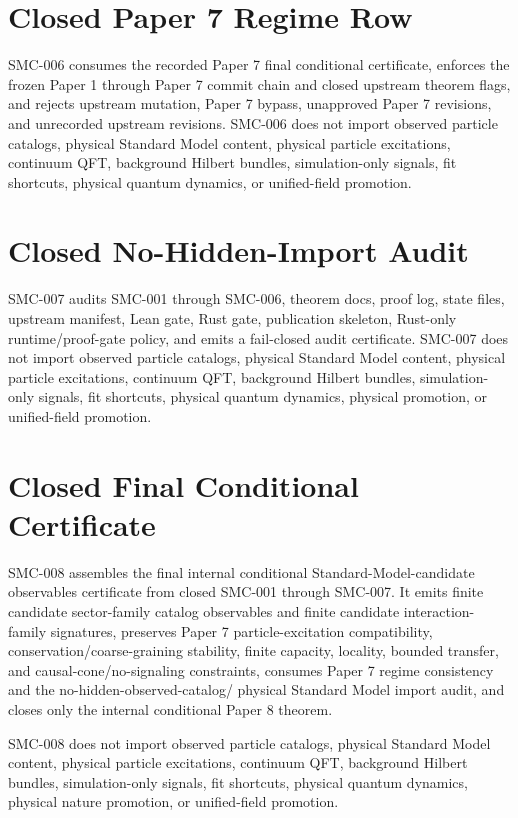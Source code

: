 \documentclass{article}
\begin{document}
\section{Closed Paper 7 Regime Row}

SMC-006 consumes the recorded Paper 7 final conditional certificate, enforces
the frozen Paper 1 through Paper 7 commit chain and closed upstream theorem
flags, and rejects upstream mutation, Paper 7 bypass, unapproved Paper 7
revisions, and unrecorded upstream revisions. SMC-006 does not import
observed particle catalogs, physical Standard Model content, physical
particle excitations, continuum QFT, background Hilbert bundles,
simulation-only signals, fit shortcuts, physical quantum dynamics, or
unified-field promotion.

\section{Closed No-Hidden-Import Audit}

SMC-007 audits SMC-001 through SMC-006, theorem docs, proof log, state files,
upstream manifest, Lean gate, Rust gate, publication skeleton, Rust-only
runtime/proof-gate policy, and emits a fail-closed audit certificate. SMC-007
does not import observed particle catalogs, physical Standard Model content,
physical particle excitations, continuum QFT, background Hilbert bundles,
simulation-only signals, fit shortcuts, physical quantum dynamics, physical
promotion, or unified-field promotion.

\section{Closed Final Conditional Certificate}

SMC-008 assembles the final internal conditional Standard-Model-candidate
observables certificate from closed SMC-001 through SMC-007. It emits finite
candidate sector-family catalog observables and finite candidate
interaction-family signatures, preserves Paper 7 particle-excitation
compatibility, conservation/coarse-graining stability, finite capacity,
locality, bounded transfer, and causal-cone/no-signaling constraints,
consumes Paper 7 regime consistency and the no-hidden-observed-catalog/
physical Standard Model import audit, and closes only the internal
conditional Paper 8 theorem.

SMC-008 does not import observed particle catalogs, physical Standard Model
content, physical particle excitations, continuum QFT, background Hilbert
bundles, simulation-only signals, fit shortcuts, physical quantum dynamics,
physical nature promotion, or unified-field promotion.
\end{document}
